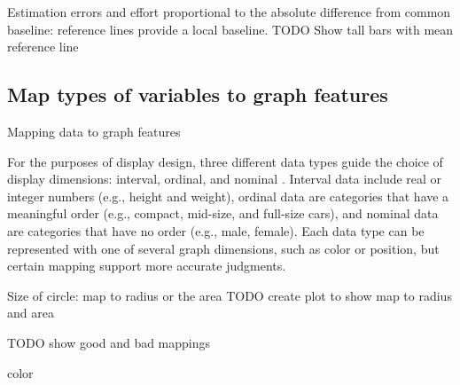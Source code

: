\documentclass[]{krantz}
\makeatletter
\newenvironment{Shaded}{\begin{snugshade}}{\end{snugshade}}
\newcommand{\KeywordTok}[1]{\textcolor[rgb]{0.13,0.29,0.53}{\textbf{#1}}}
\newcommand{\DataTypeTok}[1]{\textcolor[rgb]{0.13,0.29,0.53}{#1}}
\newcommand{\DecValTok}[1]{\textcolor[rgb]{0.00,0.00,0.81}{#1}}
\newcommand{\FloatTok}[1]{\textcolor[rgb]{0.00,0.00,0.81}{#1}}
\newcommand{\StringTok}[1]{\textcolor[rgb]{0.31,0.60,0.02}{#1}}
\newcommand{\OperatorTok}[1]{\textcolor[rgb]{0.81,0.36,0.00}{\textbf{#1}}}
\newcommand{\NormalTok}[1]{#1}
\newenvironment{kframe}{%
\medskip{}
\setlength{\fboxsep}{.8em}
 \def\at@end@of@kframe{}%
 \ifinner\ifhmode%
  \def\at@end@of@kframe{\end{minipage}}%
  \begin{minipage}{\columnwidth}%
 \fi\fi%
 \def\FrameCommand##1{\hskip\@totalleftmargin \hskip-\fboxsep
 \colorbox{shadecolor}{##1}\hskip-\fboxsep
     \hskip-\linewidth \hskip-\@totalleftmargin \hskip\columnwidth}%
 \MakeFramed {\advance\hsize-\width
   \@totalleftmargin\z@ \linewidth\hsize
   \@setminipage}}%
 {\par\unskip\endMakeFramed%
 \at@end@of@kframe}
\renewenvironment{Shaded}{\begin{kframe}}{\end{kframe}}
\theoremstyle{definition}
\theoremstyle{definition}
\theoremstyle{definition}
\theoremstyle{remark}
\makeatother
\begin{document}
Estimation errors and effort proportional to the absolute difference
from common baseline: reference lines provide a local baseline. TODO
Show tall bars with mean reference line

\subsection{Map types of variables to graph
features}\label{map-types-of-variables-to-graph-features}

Mapping data to graph features \citep{Cleveland1985}

For the purposes of display design, three different data types guide the
choice of display dimensions: interval, ordinal, and nominal
\citep{Cleveland1985}. Interval data include real or integer numbers
(e.g., height and weight), ordinal data are categories that have a
meaningful order (e.g., compact, mid-size, and full-size cars), and
nominal data are categories that have no order (e.g., male, female).
Each data type can be represented with one of several graph dimensions,
such as color or position, but certain mapping support more accurate
judgments.

Size of circle: map to radius or the area TODO create plot to show map
to radius and area

TODO show good and bad mappings

color \citep{Silva2011}

\begin{Shaded}
\end{Shaded}
\end{document}
